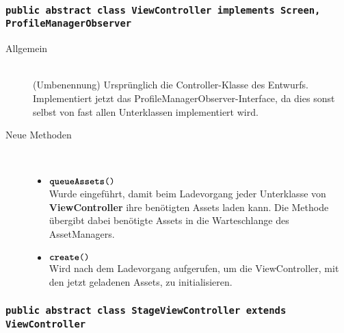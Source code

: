 \subsubsection{\normalfont \texttt{public abstract class \textbf{ViewController} implements Screen, ProfileManagerObserver}}

\begin{description}
\item[Allgemein] \hfill \\ (Umbenennung) Ursprünglich die Controller-Klasse des Entwurfs. Implementiert jetzt das ProfileManagerObserver-Interface, da dies sonst selbst von fast allen Unterklassen implementiert wird.
	
\item[Neue Methoden] \hfill \\
	\vspace{-.8cm}
	\begin{itemize}
		\item $\texttt{\textbf{queueAssets}()}$ \\ Wurde eingeführt, damit beim Ladevorgang jeder Unterklasse von \textbf{ViewController} ihre benötigten Assets laden kann. Die Methode übergibt dabei benötigte Assets in die Warteschlange des AssetManagers.
		\item $\texttt{\textbf{create}()}$ \\ Wird nach dem Ladevorgang aufgerufen, um die ViewController, mit den jetzt geladenen Assets, zu initialisieren.
	\end{itemize}
\end{description}

\subsubsection{\normalfont \texttt{public abstract class \textbf{StageViewController} extends ViewController}}

